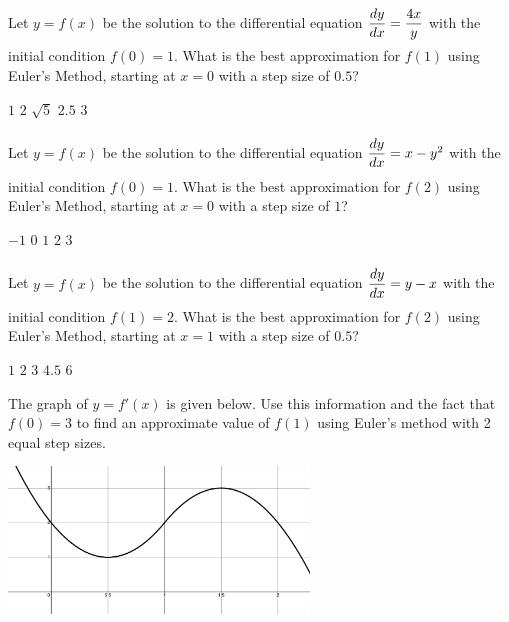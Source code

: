 \begin{questions}
    \question Let $y = f(x)$ be the solution to the differential equation $\dfrac{dy}{dx} = \dfrac{4x}{y} \forcespace$ with the initial condition $f(0) = 1$. What is the best approximation for $f(1)$ using Euler's Method, starting at $x = 0$ with a step size of $0.5$? \\

    \begin{oneparchoices}
        \choice $1$
        \choice $2$
        \choice $\sqrt{5}$
        \choice $2.5$
        \choice $3$
    \end{oneparchoices} \par \horizontalline

    \question Let $y = f(x)$ be the solution to the differential equation $\dfrac{dy}{dx} = x - y^2 \forcespace$ with the initial condition $f(0) = 1$. What is the best approximation for $f(2)$ using Euler's Method, starting at $x = 0$ with a step size of $1$? \\

    \begin{oneparchoices}
        \choice $-1$
        \choice $0$
        \choice $1$
        \choice $2$
        \choice $3$
    \end{oneparchoices} \par \horizontalline

    \question Let $y = f(x)$ be the solution to the differential equation $\dfrac{dy}{dx} = y - x \forcespace$ with the initial condition $f(1) = 2$. What is the best approximation for $f(2)$ using Euler's Method, starting at $x = 1$ with a step size of $0.5$? \\

    \begin{oneparchoices}
        \choice $1$
        \choice $2$
        \choice $3$
        \choice $4.5$
        \choice $6$
    \end{oneparchoices} \par \horizontalline

    \question The graph of $y = f'(x)$ is given below. Use this information and the fact that $f(0) = 3$ to find an approximate value of $f(1)$ using Euler's method with 2 equal step sizes. \\

    \begin{center}
        \includegraphics[width = 0.6\textwidth]{Support/Chapter 1 Graphics/1.4-Graphic4.png}
    \end{center} 


\end{questions}
